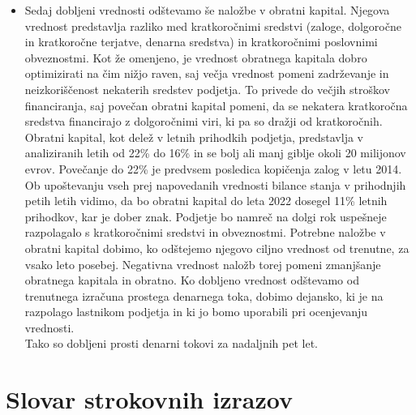 \documentclass[12pt,a4paper]{amsart}
\theoremstyle{definition} %
\theoremstyle{plain} %
\newcommand{\geslo}[2]{\noindent\textbf{#1}\hspace*{3mm}\hangindent=\parindent\hangafter=1 #2}
\begin{document}
\begin{itemize}
\begin{itemize}
\item Sedaj dobljeni vrednosti odštevamo še naložbe v obratni kapital. Njegova vrednost predstavlja razliko med kratkoročnimi sredstvi (zaloge, dolgoročne in kratkoročne terjatve, denarna sredstva) in kratkoročnimi poslovnimi obveznostmi. Kot že omenjeno, je vrednost obratnega kapitala dobro optimizirati na čim nižjo raven, saj večja vrednost pomeni zadrževanje in neizkoriščenost nekaterih sredstev podjetja. To privede do večjih stroškov financiranja, saj povečan obratni kapital pomeni, da se nekatera kratkoročna sredstva financirajo z dolgoročnimi viri, ki pa so dražji od kratkoročnih. Obratni kapital, kot delež v letnih prihodkih podjetja, predstavlja v analiziranih letih od 22\% do 16\% in se bolj ali manj giblje okoli 20 milijonov evrov.  Povečanje do 22\% je predvsem posledica kopičenja zalog v letu 2014. Ob upoštevanju vseh prej napovedanih vrednosti bilance stanja v prihodnjih petih letih vidimo, da bo obratni kapital do leta 2022 dosegel 11\% letnih prihodkov, kar je dober znak. Podjetje bo namreč na dolgi rok uspešneje razpolagalo s kratkoročnimi sredstvi in obveznostmi. Potrebne naložbe v obratni kapital dobimo, ko odštejemo njegovo ciljno vrednost od trenutne, za vsako leto posebej. Negativna vrednost naložb torej pomeni zmanjšanje obratnega kapitala in obratno. Ko dobljeno vrednost odštevamo od trenutnega izračuna prostega denarnega toka, dobimo dejansko, ki je na razpolago lastnikom podjetja in ki jo bomo uporabili pri ocenjevanju vrednosti.\\
Tako so dobljeni prosti denarni tokovi za nadaljnih pet let. 
\end{itemize}

\end{itemize}

  







\section*{Slovar strokovnih izrazov}

%
%


\begin{thebibliography}{99}




\end{thebibliography}
\end{document}
